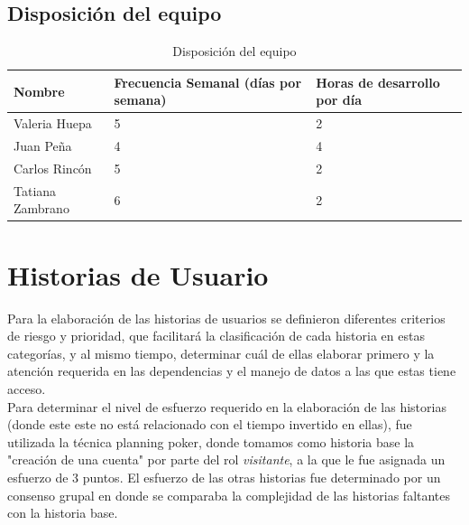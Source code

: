 \documentclass[a4paper,12 pt]{article}
\begin{document}
\subsection{Disposición del equipo}

\begin{table}[H]
    \centering
    \small{
    \begin{tabular}{|M{2cm}|M{4cm}|M{4cm}|}
        \hline
        \textbf{Nombre}    & \textbf{Frecuencia Semanal (días por semana)}   
        &\textbf{Horas de desarrollo por día}\\
        \hline
        Valeria Huepa   &   5    &   2   \\
        \hline
        Juan Peña       &   4    &    4   \\
        \hline
        Carlos Rincón   &   5    &  2     \\
        \hline
        Tatiana Zambrano    & 6      &  2     \\
        \hline
    \end{tabular}
    \caption{Disposición del equipo}
    \label{tab:my_label}}
\end{table}{}

\section{Historias de Usuario}

Para la elaboración de las historias de usuarios se definieron diferentes
criterios de riesgo y prioridad, que facilitará la clasificación de cada
historia en estas categorías, y al mismo tiempo, determinar cuál de ellas
elaborar primero y la atención requerida en las dependencias y el manejo de
datos a las que estas tiene acceso.\\

Para determinar el nivel de esfuerzo requerido en la elaboración de las
historias (donde este este no está relacionado con el tiempo invertido en
ellas), fue utilizada la técnica planning poker, donde tomamos como historia
base la "creación de una cuenta" por parte del rol \textit{visitante}, a la que
le fue asignada un esfuerzo de 3 puntos. El esfuerzo de las otras historias fue
determinado por un consenso grupal en donde se comparaba la complejidad de las
historias faltantes con la historia base.\\
\end{document}
